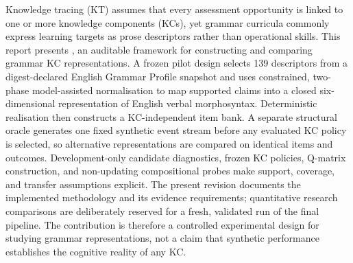 Knowledge tracing (KT) assumes that every assessment opportunity is linked to
one or more knowledge components (KCs), yet grammar curricula commonly express
learning targets as prose descriptors rather than operational skills.  This
report presents \system, an auditable framework for constructing and comparing
grammar KC representations.  A frozen pilot design selects 139 descriptors
from a digest-declared English Grammar Profile snapshot and uses constrained,
two-phase model-assisted normalisation to map supported claims into a closed
six-dimensional representation of English verbal morphosyntax.  Deterministic
realisation then constructs a KC-independent item bank.  A separate structural
oracle generates one fixed synthetic event stream before any evaluated KC
policy is selected, so alternative representations are compared on identical
items and outcomes.  Development-only candidate diagnostics, frozen KC
policies, Q-matrix construction, and non-updating compositional probes make
support, coverage, and transfer assumptions explicit.  The present revision
documents the implemented methodology and its evidence requirements;
quantitative research comparisons are deliberately reserved for a fresh,
validated run of the final pipeline.  The contribution is therefore a
controlled experimental design for studying grammar representations, not a
claim that synthetic performance establishes the cognitive reality of any KC.

